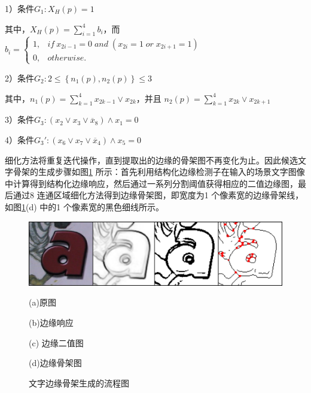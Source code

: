        1）条件$G_1: X_H(p)=1$

        其中，$X_H(p)=\sum\limits_{i=1}^4b_i$，而
        $b_i=\left\{
        \begin{array}{cl}
        1, &  if \ x_{2i-1}=0 \; and \; (x_{2i}=1 \; or \; x_{2i+1}=1)\\
        0, &  otherwise.
        \end{array}
        \right.$

        2）条件$G_2: 2\le \left\{n_1(p),n_2(p)\right\} \le3$

        其中，$n_1(p)=\sum\limits_{k=1}^4x_{2k-1}\lor x_{2k}$，并且
        $n_2(p)=\sum\limits_{k=1}^4x_{2k} \lor x_{2k+1}$

        3）条件$G_3: (x_2 \lor x_3 \lor \overline{x}_8) \land x_1=0$

        4）条件$G_3$$'$$: (x_6 \lor x_7 \lor \overline{x}_4) \land x_5=0$

        细化方法将重复迭代操作，直到提取出的边缘的骨架图不再变化为止。因此候选文字骨架的生成步骤如图\ref{fig.c3_skeleton} 所示：首先利用结构化边缘检测子在输入的场景文字图像中计算得到结构化边缘响应，然后通过一系列分割阈值获得相应的二值边缘图，最后通过8 连通区域细化方法得到边缘骨架图，即宽度为1 个像素宽的边缘骨架线，如图\ref{fig.c3_skeleton}(d) 中的1 个像素宽的黑色细线所示。

        \begin{figure}[!h]
        \centering
        \includegraphics[width=\textwidth]{./figures/c3_skeleton.jpg}
        \begin{minipage}[t]{0.24\linewidth}
        \centerline{\small (a)原图}
        \end{minipage}
        \begin{minipage}[t]{0.24\linewidth}
        \centerline{\small (b)边缘响应}
        \end{minipage}
        \begin{minipage}[t]{0.24\linewidth}
        \centerline{\small(c) 边缘二值图}
        \end{minipage}
        \begin{minipage}[t]{0.24\linewidth}
        \centerline{\small (d)边缘骨架图}
        \end{minipage}
        \caption{文字边缘骨架生成的流程图}
        \label{fig.c3_skeleton}
        \end{figure}

